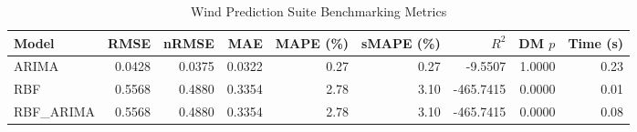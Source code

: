 \begin{table}[htbp]
\centering
\caption{Wind Prediction Suite Benchmarking Metrics}
\label{tab:wind_prediction_summary}
\begin{tabular}{lrrrrrrrr}
\toprule
Model & RMSE & nRMSE & MAE & MAPE (\%) & sMAPE (\%) & $R^2$ & DM $p$ & Time (s) \\
\midrule
ARIMA & 0.0428 & 0.0375 & 0.0322 & 0.27 & 0.27 & -9.5507 & 1.0000 & 0.23 \\
RBF & 0.5568 & 0.4880 & 0.3354 & 2.78 & 3.10 & -465.7415 & 0.0000 & 0.01 \\
RBF_ARIMA & 0.5568 & 0.4880 & 0.3354 & 2.78 & 3.10 & -465.7415 & 0.0000 & 0.08 \\
\bottomrule
\end{tabular}
\end{table}

